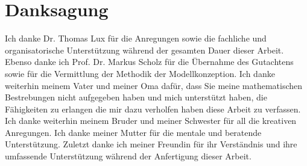 
\bigskip

\begingroup
\let\clearpage\relax
\let\cleardoublepage\relax
\let\cleardoublepage\relax
\chapter*{Danksagung}
Ich danke Dr. Thomas Lux für die Anregungen sowie die fachliche und organisatorische Unterstützung während der gesamten Dauer dieser Arbeit. Ebenso danke ich Prof. Dr. Markus Scholz für die Übernahme des Gutachtens sowie für die Vermittlung der Methodik der Modellkonzeption.
Ich danke weiterhin meinem Vater und meiner Oma dafür, dass Sie meine mathematischen Bestrebungen nicht aufgegeben haben und mich unterstützt haben, die Fähigkeiten zu erlangen die mir dazu verholfen haben diese Arbeit zu verfassen. Ich danke weiterhin meinem Bruder und meiner Schwester für all die kreativen Anregungen. Ich danke meiner Mutter für die mentale und beratende Unterstützung. Zuletzt danke ich meiner Freundin für ihr Verständnis und ihre umfassende Unterstützung während der Anfertigung dieser Arbeit.

\endgroup
